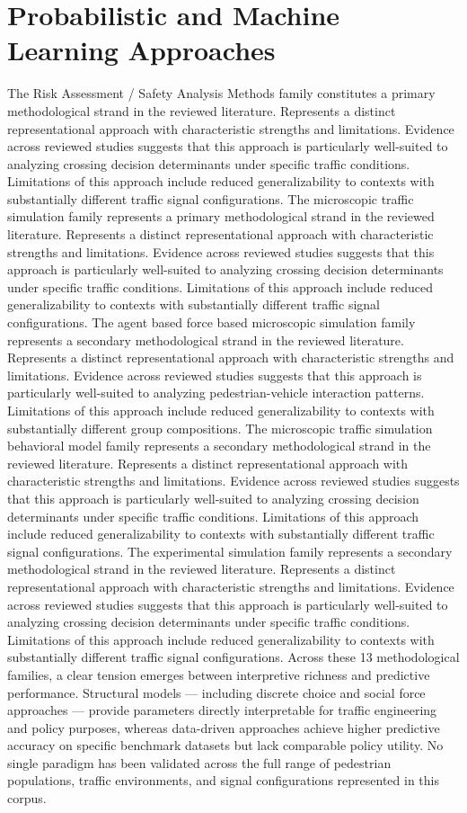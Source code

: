 \documentclass{article}
\begin{document}
\section{Probabilistic and Machine Learning Approaches}
The Risk Assessment / Safety Analysis Methods family constitutes a primary methodological strand in the reviewed literature. Represents a distinct representational approach with characteristic strengths and limitations. Evidence across reviewed studies suggests that this approach is particularly well-suited to analyzing crossing decision determinants under specific traffic conditions. Limitations of this approach include reduced generalizability to contexts with substantially different traffic signal configurations. The microscopic traffic simulation family represents a primary methodological strand in the reviewed literature. Represents a distinct representational approach with characteristic strengths and limitations. Evidence across reviewed studies suggests that this approach is particularly well-suited to analyzing crossing decision determinants under specific traffic conditions. Limitations of this approach include reduced generalizability to contexts with substantially different traffic signal configurations. The agent based force based microscopic simulation family represents a secondary methodological strand in the reviewed literature. Represents a distinct representational approach with characteristic strengths and limitations. Evidence across reviewed studies suggests that this approach is particularly well-suited to analyzing pedestrian-vehicle interaction patterns. Limitations of this approach include reduced generalizability to contexts with substantially different group compositions. The microscopic traffic simulation behavioral model family represents a secondary methodological strand in the reviewed literature. Represents a distinct representational approach with characteristic strengths and limitations. Evidence across reviewed studies suggests that this approach is particularly well-suited to analyzing crossing decision determinants under specific traffic conditions. Limitations of this approach include reduced generalizability to contexts with substantially different traffic signal configurations. The experimental simulation family represents a secondary methodological strand in the reviewed literature. Represents a distinct representational approach with characteristic strengths and limitations. Evidence across reviewed studies suggests that this approach is particularly well-suited to analyzing crossing decision determinants under specific traffic conditions. Limitations of this approach include reduced generalizability to contexts with substantially different traffic signal configurations. Across these 13 methodological families, a clear tension emerges between interpretive richness and predictive performance. Structural models — including discrete choice and social force approaches — provide parameters directly interpretable for traffic engineering and policy purposes, whereas data-driven approaches achieve higher predictive accuracy on specific benchmark datasets but lack comparable policy utility. No single paradigm has been validated across the full range of pedestrian populations, traffic environments, and signal configurations represented in this corpus.
\end{document}
